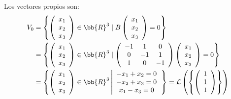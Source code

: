 \begin{ejercicio}
\begin{enumerate}
        Los vectores propios son:
        \begin{equation*}\begin{split}
           V_{0} & = \left\{ \left(\begin{array}{c}
                    x_1 \\
                    x_2 \\
                    x_3
               \end{array}\right) \in \bb{R}^3 \mid B\left(\begin{array}{c}
                    x_1 \\
                    x_2 \\
                    x_3
               \end{array}\right) = 0 \right\} \\
               & = \left\{ \left(\begin{array}{c}
                    x_1 \\
                    x_2 \\
                    x_3
               \end{array}\right) \in \bb{R}^3 \mid \left( \begin{array}{ccc}
                -1 & 1 & 0 \\
                0  & -1 & 1 \\
                1 & 0 & -1
            \end{array}\right) \left(\begin{array}{c}
                    x_1 \\
                    x_2 \\
                    x_3
               \end{array}\right) = 0 \right\} \\
               & = \left\{ \left(\begin{array}{c}
                    x_1 \\
                    x_2  \\
                    x_3
               \end{array}\right) \in \bb{R}^3 \left| \begin{array}{c}
                    -x_1 + x_2 = 0 \\
                    -x_2 + x_3 = 0 \\
                    x_1 - x_3 = 0
               \end{array}\right. \right\}
               = \mathcal{L}\left(\left\{
                    \left(\begin{array}{c}
                        1 \\
                        1 \\
                        1 \\
                   \end{array}\right)
                   \right\}\right)
       \end{split}\end{equation*}
    \end{enumerate}
\end{ejercicio}

